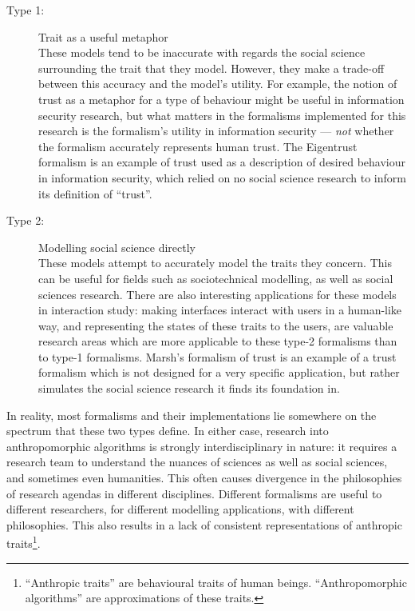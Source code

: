 \begin{description}
    \item [Type 1: ] Trait as a useful metaphor\\
        These models tend to be inaccurate with regards the social science surrounding the trait that they model. However, they make a trade-off between this accuracy and the model's utility. For example, the notion of trust as a metaphor for a type of behaviour might be useful in information security research, but what matters in the formalisms implemented for this research is the formalism's utility in information security --- \emph{not} whether the formalism accurately represents human trust. The Eigentrust formalism\cite{eigentrust} is an example of trust used as a description of desired behaviour in information security, which relied on no social science research to inform its definition of ``trust''.
\item [Type 2: ] Modelling social science directly\\
    These models attempt to accurately model the traits they concern. This can be useful for fields such as sociotechnical modelling, as well as social sciences research. There are also interesting applications for these models in interaction study: making interfaces interact with users in a human-like way, and representing the states of these traits to the users, are valuable research areas which are more applicable to these type-2 formalisms than to type-1 formalisms. Marsh's formalism of trust\cite{Marsh1994FormalisingConcept} is an example of a trust formalism which is not designed for a very specific application, but rather simulates the social science research it finds its foundation in.
\end{description}

In reality, most formalisms and their implementations lie somewhere on the spectrum that these two types define. In either case, research into anthropomorphic algorithms is strongly interdisciplinary in nature: it requires a research team to understand the nuances of sciences as well as social sciences, and sometimes even humanities. This often causes divergence in the philosophies of research agendas in different disciplines. Different formalisms are useful to different researchers, for different modelling applications, with different philosophies. This also results in a lack of consistent representations of anthropic traits\footnote{``Anthropic traits'' are behavioural traits of human beings. ``Anthropomorphic algorithms'' are approximations of these traits.}.

